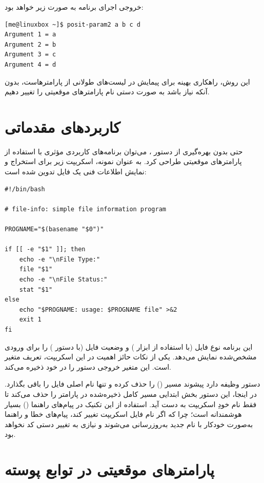 خروجی اجرای برنامه به صورت زیر خواهد بود:

\begin{latin}
\begin{lstlisting}
[me@linuxbox ~]$ posit-param2 a b c d
Argument 1 = a
Argument 2 = b
Argument 3 = c
Argument 4 = d
\end{lstlisting}
\end{latin}

این روش، راهکاری بهینه برای پیمایش در لیست‌های طولانی از پارامترهاست، بدون آنکه نیاز باشد به صورت دستی نام پارامترهای موقعیتی را تغییر دهیم.

\section{کاربردهای مقدماتی}

حتی بدون بهره‌گیری از دستور ، می‌توان برنامه‌های کاربردی مؤثری با استفاده از پارامترهای موقعیتی طراحی کرد. به عنوان نمونه، اسکریپت زیر برای استخراج و نمایش اطلاعات فنی یک فایل تدوین شده است:

\begin{latin}
\begin{lstlisting}
#!/bin/bash

# file-info: simple file information program

PROGNAME="$(basename "$0")"

if [[ -e "$1" ]]; then
    echo -e "\nFile Type:"
    file "$1"
    echo -e "\nFile Status:"
    stat "$1"
else
    echo "$PROGNAME: usage: $PROGNAME file" >&2
    exit 1
fi
\end{lstlisting}
\end{latin}

این برنامه نوع فایل (با استفاده از ابزار ) و وضعیت فایل (با دستور ) را برای ورودی مشخص‌شده نمایش می‌دهد. یکی از نکات حائز اهمیت در این اسکریپت، تعریف متغیر  است. این متغیر خروجی دستور  را در خود ذخیره می‌کند.

دستور  وظیفه دارد پیشوند مسیر () را حذف کرده و تنها نام اصلی فایل را باقی بگذارد. در اینجا، این دستور بخش ابتدایی مسیر کامل ذخیره‌شده در پارامتر  را حذف می‌کند تا فقط نام خودِ اسکریپت به دست آید. استفاده از این تکنیک در پیام‌های راهنما () بسیار هوشمندانه است؛ چرا که اگر نام فایل اسکریپت تغییر کند، پیام‌های خطا و راهنما به‌صورت خودکار با نام جدید به‌روزرسانی می‌شوند و نیازی به تغییر دستی کد نخواهد بود.

\section{پارامترهای موقعیتی در توابع پوسته}

